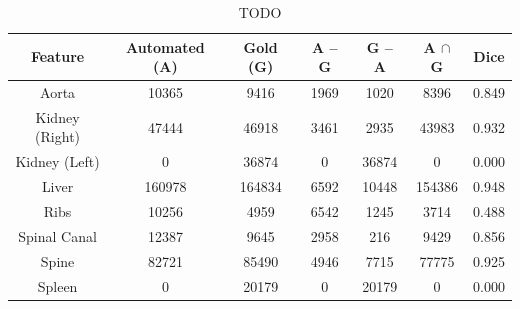 \begin{table}[p]
\begin{center}
\begin{tabular}{c|cccccc}
\footnotesize \textbf{Feature} & \footnotesize \textbf{Automated (A)} & \footnotesize \textbf{Gold (G)} & \footnotesize \textbf{A -- G} & \footnotesize \textbf{G -- A} & \footnotesize \textbf{A $\cap$ G} & \footnotesize \textbf{Dice} \\
\hline
\footnotesize Aorta & \footnotesize 10365 & \footnotesize 9416 & \footnotesize 1969 & \footnotesize 1020 & \footnotesize 8396 & \footnotesize 0.849 \\
\footnotesize Kidney (Right) & \footnotesize 47444 & \footnotesize 46918 & \footnotesize 3461 & \footnotesize 2935 & \footnotesize 43983 & \footnotesize 0.932 \\
\footnotesize Kidney (Left) & \footnotesize 0 & \footnotesize 36874 & \footnotesize 0 & \footnotesize 36874 & \footnotesize 0 & \footnotesize 0.000 \\
\footnotesize Liver & \footnotesize 160978 & \footnotesize 164834 & \footnotesize 6592 & \footnotesize 10448 & \footnotesize 154386 & \footnotesize 0.948 \\
\footnotesize Ribs & \footnotesize 10256 & \footnotesize 4959 & \footnotesize 6542 & \footnotesize 1245 & \footnotesize 3714 & \footnotesize 0.488 \\
\footnotesize Spinal Canal & \footnotesize 12387 & \footnotesize 9645 & \footnotesize 2958 & \footnotesize 216 & \footnotesize 9429 & \footnotesize 0.856 \\
\footnotesize Spine & \footnotesize 82721 & \footnotesize 85490 & \footnotesize 4946 & \footnotesize 7715 & \footnotesize 77775 & \footnotesize 0.925 \\
\footnotesize Spleen & \footnotesize 0 & \footnotesize 20179 & \footnotesize 0 & \footnotesize 20179 & \footnotesize 0 & \footnotesize 0.000 \\
\end{tabular}
\end{center}
\caption{TODO}
\label{tbl:validation-EB-2-60-80}
\end{table}

